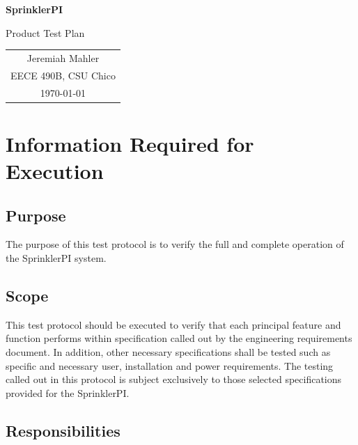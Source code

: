\documentclass{article}
\begin{document}
\vspace*{1.0in}

\centerline{\LARGE \textbf{SprinklerPI}}
\vspace{0.3in}
\centerline{\LARGE Product Test Plan}

\vfill

\begin{center}
\begin{tabular}{c}
Jeremiah Mahler \\
EECE 490B, CSU Chico \\
\today
\end{tabular}
\end{center}

\vspace{1in}

\thispagestyle{empty}


\pagebreak

\thispagestyle{empty}
\tableofcontents
\clearpage

\section{Information Required for Execution}

\subsection{Purpose}

The purpose of this test protocol is to verify the full and complete
operation of the SprinklerPI system.

\subsection{Scope}

This test protocol should be executed to verify that each principal feature
and function performs within specification called out by the engineering
requirements document. In addition, other necessary specifications shall
be tested such as specific and necessary user, installation and power
requirements. The testing called out in this protocol is subject exclusively
to those selected specifications provided for the SprinklerPI.

\subsection{Responsibilities}
\end{document}
